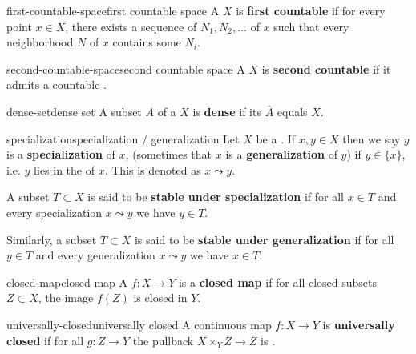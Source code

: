\begin{topic}{first-countable-space}{first countable space}
    A  $X$ is \textbf{first countable} if for every point $x \in X$, there exists a sequence of  $N_1, N_2, \ldots$ of $x$ such that every neighborhood $N$ of $x$ contains some $N_i$.
\end{topic}

\begin{topic}{second-countable-space}{second countable space}
    A  $X$ is \textbf{second countable} if it admits a countable .
\end{topic}

\begin{topic}{dense-set}{dense set}
    A subset $A$ of a  $X$ is \textbf{dense} if its  $\overline{A}$ equals $X$.
\end{topic}

\begin{topic}{specialization}{specialization / generalization}
    Let $X$ be a . If $x, y \in X$ then we say $y$ is a \textbf{specialization} of $x$, (sometimes that $x$ is a \textbf{generalization} of $y$) if $y \in \overline{\{ x \}}$, i.e. $y$ lies in the  of $x$. This is denoted as $x \leadsto y$.
    
    A subset $T \subset X$ is said to be \textbf{stable under specialization} if for all $x \in T$ and every specialization $x \leadsto y$ we have $y \in T$.
    
    Similarly, a subset $T \subset X$ is said to be \textbf{stable under generalization} if for all $y \in T$ and every generalization $x \leadsto y$ we have $x \in T$.
\end{topic}

\begin{topic}{closed-map}{closed map}
    A  $f : X \to Y$ is a \textbf{closed map} if for all closed subsets $Z \subset X$, the image $f(Z)$ is closed in $Y$.
\end{topic}

\begin{topic}{universally-closed}{universally closed}
    A continuous map $f : X \to Y$ is \textbf{universally closed} if for all $g : Z \to Y$ the pullback $X \times_Y Z \to Z$ is .
\end{topic}

